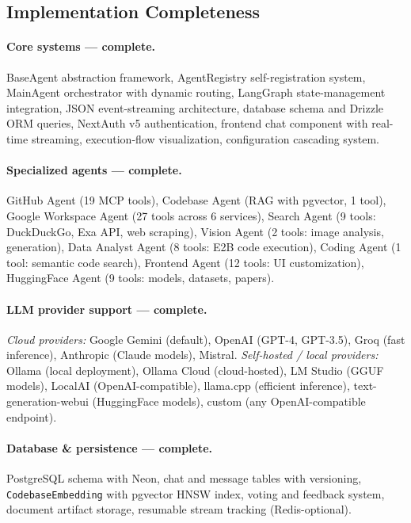 \documentclass[11pt,a4paper]{report}
\newcommand{\code}[1]{\texttt{\small #1}}
\begin{document}
\subsection{Implementation Completeness}

\paragraph{Core systems --- complete.}
BaseAgent abstraction framework, AgentRegistry self-registration system,
MainAgent orchestrator with dynamic routing, LangGraph state-management
integration, JSON event-streaming architecture, database schema and Drizzle
ORM queries, NextAuth v5 authentication, frontend chat component with
real-time streaming, execution-flow visualization, configuration cascading
system.

\paragraph{Specialized agents --- complete.}
GitHub Agent (19 MCP tools), Codebase Agent (RAG with pgvector, 1 tool),
Google Workspace Agent (27 tools across 6 services), Search Agent (9 tools:
DuckDuckGo, Exa API, web scraping), Vision Agent (2 tools: image analysis,
generation), Data Analyst Agent (8 tools: E2B code execution), Coding Agent
(1 tool: semantic code search), Frontend Agent (12 tools: UI customization),
HuggingFace Agent (9 tools: models, datasets, papers).

\paragraph{LLM provider support --- complete.}
\textit{Cloud providers:} Google Gemini (default), OpenAI (GPT-4, GPT-3.5),
Groq (fast inference), Anthropic (Claude models), Mistral.
\textit{Self-hosted / local providers:} Ollama (local deployment), Ollama
Cloud (cloud-hosted), LM Studio (GGUF models), LocalAI (OpenAI-compatible),
llama.cpp (efficient inference), text-generation-webui (HuggingFace models),
custom (any OpenAI-compatible endpoint).

\paragraph{Database \& persistence --- complete.}
PostgreSQL schema with Neon, chat and message tables with versioning,
\code{CodebaseEmbedding} with pgvector HNSW index, voting and feedback system,
document artifact storage, resumable stream tracking (Redis-optional).
\end{document}
